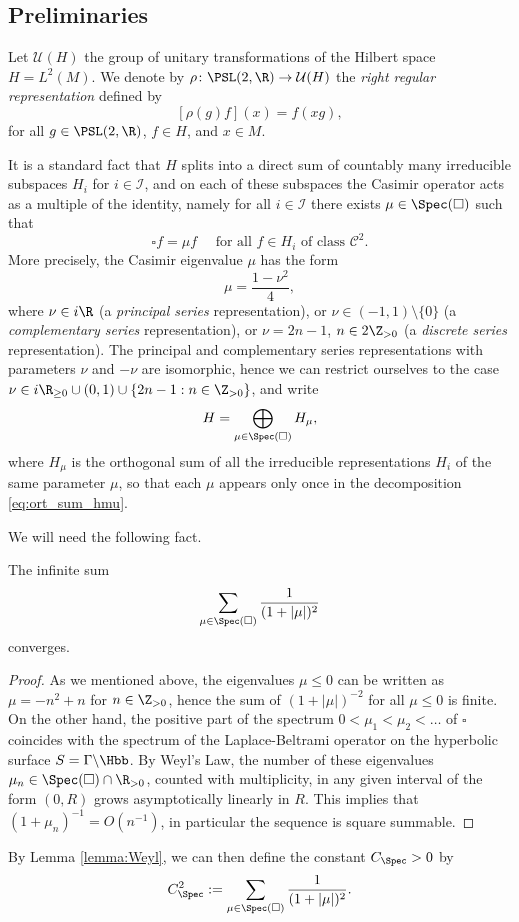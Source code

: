 \subsection{Preliminaries}

Let $\mathcal{U}(H)$ the group of unitary transformations of the Hilbert space $H= L^2(M)$.
We denote by $\rho \colon \PSL(2,\R) \to \mathcal{U}(H)$ the \emph{right regular representation} defined by
\[
[\rho(g)f](x) = f(xg),
\]
for all $g \in \PSL(2,\R)$, $f \in H$, and $x \in M$.

It is a standard fact that $H$ splits into a direct sum of countably many irreducible subspaces $H_{i}$ for $i \in \mathcal{I}$, and on each of these subspaces the Casimir operator acts as a multiple of the identity, namely for all $i \in \mathcal{I}$ there exists $\mu \in \Spec(\square)$ such that
\[
\square f = \mu f \quad \text{ for all $f \in H_i$ of class $\mathscr{C}^2$}.
\]
More precisely, the Casimir eigenvalue $\mu$ has the form
\[
\mu = \frac{1-\nu^2}{4},
\]
where $\nu \in i\R$ (a \emph{principal series} representation), or $\nu \in (-1,1) \setminus \{0\}$ (a \emph{complementary series} representation), or $\nu = 2n-1$, $n \in 2\Z_{>0}$ (a \emph{discrete series} representation).
The principal and complementary series representations with parameters $\nu$ and $-\nu$ are isomorphic, hence we can restrict ourselves to the case $\nu \in i\R_{\geq 0} \cup (0,1) \cup\allowbreak \{ 2n-\nobreak 1 :\nobreak n \in\nobreak \Z_{>0}\}$, and write
\begin{equation}\label{eq:ort_sum_hmu}
H= \bigoplus_{\mu \in \Spec(\square)} H_{\mu},
\end{equation}
where $H_\mu$ is the orthogonal sum of all the irreducible representations $H_i$ of the same parameter $\mu$, so that each $\mu$ appears only once in the decomposition \eqref{eq:ort_sum_hmu}.

We will need the following fact.
\begin{lemma}\label{lemma:Weyl}
The infinite sum
\[
\sum_{\mu \in \Spec(\square)} \frac{1}{(1+|\mu|)^2}
\]
converges.
\end{lemma}
\begin{proof}
As we mentioned above, the eigenvalues $\mu \leq 0$ can be written as $\mu = -n^2+n$ for $n \in \Z_{>0}$, hence the sum of $(1+|\mu|)^{-2}$ for all $\mu\leq 0$ is finite.
On the other hand, the positive part of the spectrum $0<\mu_1 <\mu_2< \dots$ of $\square$ coincides with the spectrum of the Laplace-Beltrami operator on the hyperbolic surface $S =\Gamma \backslash \Hbb$. By Weyl's Law, the number of these eigenvalues $\mu_n \in \Spec(\square) \cap \R_{>0}$, counted with multiplicity, in any given interval of the form $(0,R)$ grows asymptotically linearly in $R$. This implies that $(1+\mu_n)^{-1} = O(n^{-1})$, in particular the sequence is square summable.
\end{proof}
By Lemma \ref{lemma:Weyl}, we can then define the constant $C_{\Spec}>0$ by
\[
C^2_{\Spec}:=\sum_{\mu \in \Spec(\square)} \frac{1}{(1+|\mu|)^2}.
\]

